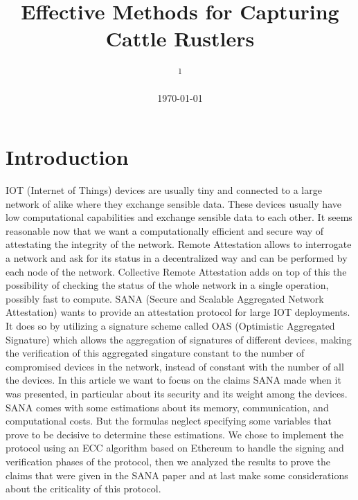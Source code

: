 \documentclass[10pt, a4paper, twocolumn]{article} %
\title{Effective Methods for Capturing Cattle Rustlers} %
\author{
	\authorstyle{John Marston\textsuperscript{1,2,3} and Bonnie MacFarlane\textsuperscript{2,3}} %
	\newline\newline %
	\textsuperscript{1}\institution{Università degli studi di Padova, Padova, Italy}\\ %
}
\date{\today} %
\begin{document}
\maketitle %

\thispagestyle{firstpage} %



\section{Introduction}

IOT (Internet of Things) devices are usually tiny and connected to a large network of alike where they exchange sensible data.
These devices usually have low computational capabilities and exchange sensible data to each other.
It seems reasonable now that we want a computationally efficient and secure way of attestating the integrity of the network.
Remote Attestation allows to interrogate a network and ask for its status in a decentralized way and can be performed by each node of the network.
Collective Remote Attestation adds on top of this the possibility of checking the status of the whole network in a single operation, possibly fast to compute.
SANA (Secure and Scalable Aggregated Network Attestation) wants to provide an attestation protocol for large IOT deployments.
It does so by utilizing a signature scheme called OAS (Optimistic Aggregated Signature) which allows the aggregation of signatures of different devices, making the verification of this aggregated singature constant to the number of compromised devices in the network, instead of constant with the number of all the devices.
In this article we want to focus on the claims SANA made when it was presented, in particular about its security and its weight among the devices.
SANA comes with some estimations about its memory, communication, and computational costs. But the formulas neglect specifying some variables that prove to be decisive to determine these estimations.
We chose to implement the protocol using an ECC algorithm based on Ethereum to handle the signing and verification phases of the protocol, then we analyzed the results to prove the claims that were given in the SANA paper and at last make some considerations about the criticality of this protocol.
\end{document}
